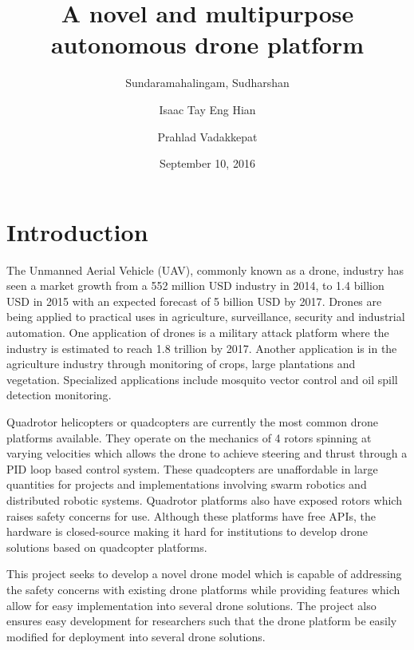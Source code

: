 \documentclass[12pt]{article}
\title{A novel and multipurpose autonomous drone platform}
\date{September 10, 2016}
\author{
	Sundaramahalingam, Sudharshan\\
	\and
	Isaac Tay Eng Hian\\
	\and
	Prahlad Vadakkepat
}
\begin{document}
\maketitle
{}
\newpage
{}

\section{Introduction}

The Unmanned Aerial Vehicle (UAV), commonly known as a drone, industry has seen a market growth from a 552 million USD industry in 2014, to 1.4 billion USD in 2015 with an expected forecast of 5 billion USD by 2017\cite{legalandsocial}. Drones are being applied to practical uses in agriculture, surveillance, security and industrial automation. One application of drones is a military attack platform where the industry is estimated to reach 1.8 trillion by 2017\cite{dronewars}. Another application is in the agriculture industry through monitoring of crops, large plantations and vegetation\cite{agriculture}. Specialized applications include mosquito vector control\cite{mosquito} and oil spill detection monitoring\cite{oilspill}. 

Quadrotor helicopters or quadcopters are currently the most common drone platforms available. They operate on the mechanics of 4 rotors spinning at varying velocities which allows the drone to achieve steering and thrust through a PID loop based control system\cite{Multiwii}. These quadcopters are unaffordable in large quantities for projects and implementations involving swarm robotics and distributed robotic systems. Quadrotor platforms also have exposed rotors which raises safety concerns for use. Although these platforms have free APIs, the hardware is closed-source making it hard for institutions to develop drone solutions based on quadcopter platforms.

This project seeks to develop a novel drone model which is capable of addressing the safety concerns with existing drone platforms while providing features which allow for easy implementation into several drone solutions. The project also ensures easy development for researchers such that the drone platform be easily modified for deployment into several drone solutions.
\end{document}
